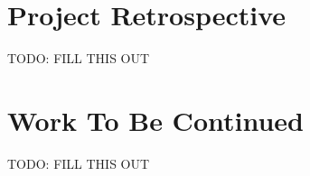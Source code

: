 \section{Project Retrospective}

TODO: FILL THIS OUT

\section{Work To Be Continued}

TODO: FILL THIS OUT